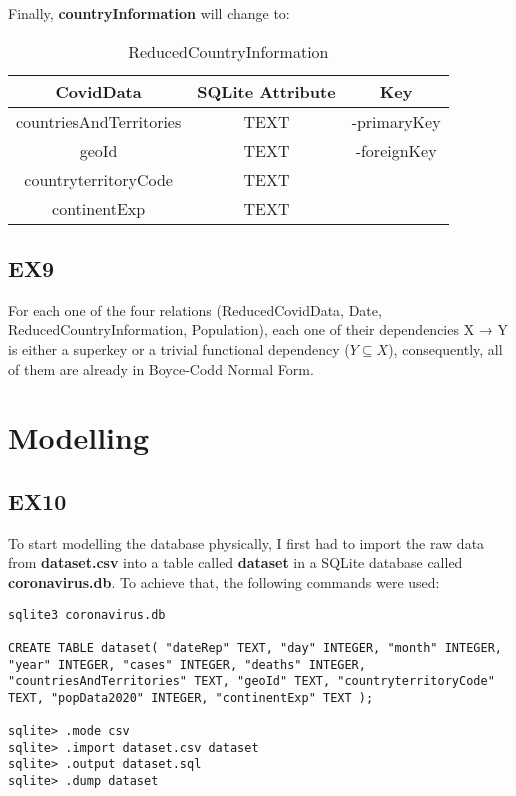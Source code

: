 \documentclass{article}
\begin{document}
Finally, \textbf{countryInformation} will change to:

\begin{table}[ht]
    \caption{ReducedCountryInformation}
    \vspace{5pt}
    \centering
    \begin{tabular}{c c c}
    \hline\hline
      CovidData  & SQLite Attribute & Key\\ [0.5ex]
    \hline
      countriesAndTerritories  & TEXT & -primaryKey\\
      geoId  & TEXT & -foreignKey\\
      countryterritoryCode  & TEXT \\
      continentExp  & TEXT \\ [0.5ex]
    \hline
    \end{tabular}
    \label{tab:countryInfo2}
\end{table}

\subsection{EX9}

For each one of the four relations (ReducedCovidData, Date, ReducedCountryInformation, Population), each one of their dependencies X → Y is either a superkey or a trivial functional dependency ($Y \subseteq X$), consequently, all of them are already in Boyce-Codd Normal Form.

\section{Modelling}
\subsection{EX10}

To start modelling the database physically, I first had to import the raw data from \textbf{dataset.csv} into a table called \textbf{dataset} in a SQLite database called \textbf{coronavirus.db}. To achieve that, the following commands were used:

\begin{lstlisting}[caption={CMD commands for dataset.sql}]
sqlite3 coronavirus.db

CREATE TABLE dataset( "dateRep" TEXT, "day" INTEGER, "month" INTEGER, "year" INTEGER, "cases" INTEGER, "deaths" INTEGER, "countriesAndTerritories" TEXT, "geoId" TEXT, "countryterritoryCode" TEXT, "popData2020" INTEGER, "continentExp" TEXT );

sqlite> .mode csv
sqlite> .import dataset.csv dataset
sqlite> .output dataset.sql
sqlite> .dump dataset
\end{lstlisting}
\end{document}
